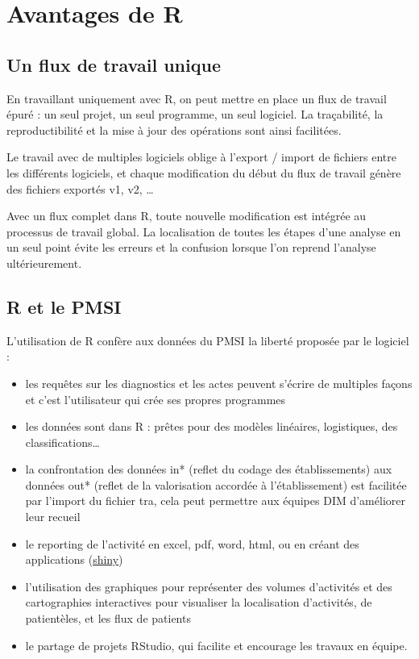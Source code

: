 \documentclass[]{book}
\providecommand{\tightlist}{%
  \setlength{\itemsep}{0pt}\setlength{\parskip}{0pt}}
\theoremstyle{definition}
\theoremstyle{definition}
\theoremstyle{definition}
\theoremstyle{remark}
\begin{document}
\section{Avantages de R}\label{avantages-de-r}

\subsection{Un flux de travail unique}\label{un-flux-de-travail-unique}

En travaillant uniquement avec R, on peut mettre en place un flux de
travail épuré : un seul projet, un seul programme, un seul logiciel. La
traçabilité, la reproductibilité et la mise à jour des opérations sont
ainsi facilitées.

Le travail avec de multiples logiciels oblige à l'export / import de
fichiers entre les différents logiciels, et chaque modification du début
du flux de travail génère des fichiers exportés v1, v2, \ldots{}

Avec un flux complet dans R, toute nouvelle modification est intégrée au
processus de travail global. La localisation de toutes les étapes d'une
analyse en un seul point évite les erreurs et la confusion lorsque l'on
reprend l'analyse ultérieurement.

\subsection{R et le PMSI}\label{r-et-le-pmsi}

L'utilisation de R confère aux données du PMSI la liberté proposée par
le logiciel :

\begin{itemize}
\tightlist
\item
  les requêtes sur les diagnostics et les actes peuvent s'écrire de
  multiples façons et c'est l'utilisateur qui crée ses propres
  programmes
\item
  les données sont dans R : prêtes pour des modèles linéaires,
  logistiques, des classifications\ldots{}
\item
  la confrontation des données in* (reflet du codage des établissements)
  aux données out* (reflet de la valorisation accordée à
  l'établissement) est facilitée par l'import du fichier tra, cela peut
  permettre aux équipes DIM d'améliorer leur recueil
\item
  le reporting de l'activité en excel, pdf, word, html, ou en créant des
  applications (\href{http://shiny.rstudio.com}{shiny})
\item
  l'utilisation des graphiques pour représenter des volumes d'activités
  et des cartographies interactives pour visualiser la localisation
  d'activités, de patientèles, et les flux de patients
\item
  le partage de projets RStudio, qui facilite et encourage les travaux
  en équipe.
\end{itemize}
\end{document}
